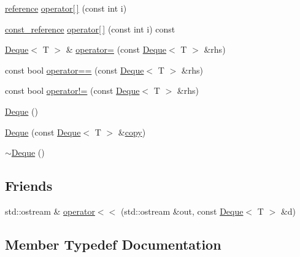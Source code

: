 \begin{DoxyCompactItemize}
\item 
\hyperlink{classprism_1_1_deque_a93d8792e719ca205ce1b9ed5d8207c1d}{reference} \hyperlink{classprism_1_1_deque_ad47fd037b004a4f4d466b6333c819010}{operator\mbox{[}$\,$\mbox{]}} (const int i)
\item 
\hyperlink{classprism_1_1_deque_a8fcabfe6976606b91b4abef0e0353584}{const\+\_\+reference} \hyperlink{classprism_1_1_deque_ae821fc4bcdd62b024afbac40b4a67279}{operator\mbox{[}$\,$\mbox{]}} (const int i) const 
\item 
\hyperlink{classprism_1_1_deque}{Deque}$<$ T $>$ \& \hyperlink{classprism_1_1_deque_a248bc973d87dc08e987198ed3f29358e}{operator=} (const \hyperlink{classprism_1_1_deque}{Deque}$<$ T $>$ \&rhs)
\item 
const bool \hyperlink{classprism_1_1_deque_a76d9b447262d0079aa36028c6416f3b8}{operator==} (const \hyperlink{classprism_1_1_deque}{Deque}$<$ T $>$ \&rhs)
\item 
const bool \hyperlink{classprism_1_1_deque_a736fb7c281ec9fb8c1f43b1221c60619}{operator!=} (const \hyperlink{classprism_1_1_deque}{Deque}$<$ T $>$ \&rhs)
\item 
\hyperlink{classprism_1_1_deque_ae8fcffd4a0cf7dba0e33a6983641efc2}{Deque} ()
\item 
\hyperlink{classprism_1_1_deque_abaa7ff51e27ef7acb0ca1afe523e7976}{Deque} (const \hyperlink{classprism_1_1_deque}{Deque}$<$ T $>$ \&\hyperlink{namespaceprism_ae776f4cd825f79e7af1cf6ee1d90a209}{copy})
\item 
\hyperlink{classprism_1_1_deque_a2a06b6247712d843c6f23df8ba807ca7}{$\sim$\+Deque} ()
\end{DoxyCompactItemize}
\subsection*{Friends}
\begin{DoxyCompactItemize}
\item 
std\+::ostream \& \hyperlink{classprism_1_1_deque_ad61d2d7b39e3a685744108225e82f123}{operator$<$$<$} (std\+::ostream \&out, const \hyperlink{classprism_1_1_deque}{Deque}$<$ T $>$ \&d)
\end{DoxyCompactItemize}


\subsection{Member Typedef Documentation}
